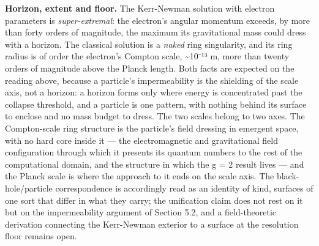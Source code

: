 \documentclass[
]{article}
\begin{document}
\textbf{Horizon, extent and floor.} The Kerr-Newman solution with
electron parameters is \emph{super-extremal}: the electron's angular
momentum exceeds, by more than forty orders of magnitude, the maximum
its gravitational mass could dress with a horizon. The classical
solution is a \emph{naked} ring singularity, and its ring radius is of
order the electron's Compton scale, \textasciitilde10⁻¹³ m, more than
twenty orders of magnitude above the Planck length. Both facts are
expected on the reading above, because a particle's impermeability is
the shielding of the scale axis, not a horizon: a horizon forms only
where energy is concentrated past the collapse threshold, and a particle
is one pattern, with nothing behind its surface to enclose and no mass
budget to dress. The two scales belong to two axes. The Compton-scale
ring structure is the particle's field dressing in emergent space, with
no hard core inside it --- the electromagnetic and gravitational field
configuration through which it presents its quantum numbers to the rest
of the computational domain, and the structure in which the g = 2 result
lives --- and the Planck scale is where the approach to it ends on the
scale axis. The black-hole/particle correspondence is accordingly read
as an identity of kind, surfaces of one sort that differ in what they
carry; the unification claim does not rest on it but on the
impermeability argument of Section 5.2, and a field-theoretic derivation
connecting the Kerr-Newman exterior to a surface at the resolution floor
remains open.
\end{document}
